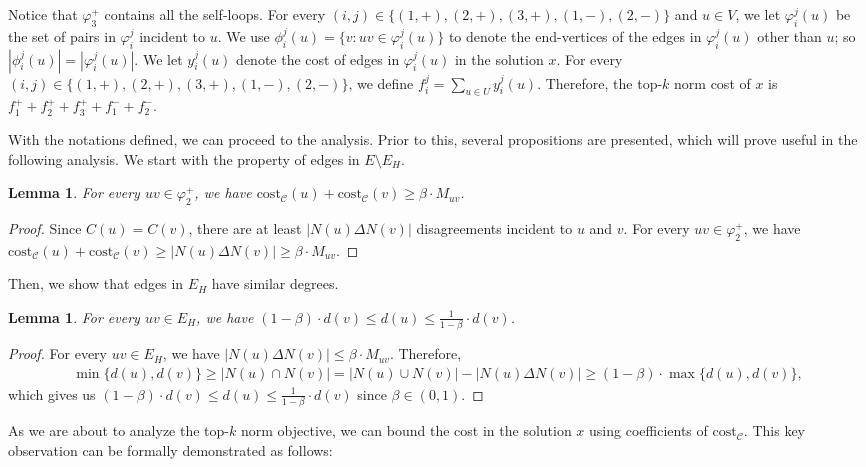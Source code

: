 \documentclass[11pt]{article}
\newcommand{\cost}{\mathrm{cost}}
\newtheorem{lemma}[theorem]{Lemma}
\newcommand{\calC}{{\mathcal{C}}}
\begin{document}
\begin{CJK*}{UTF8}{gbsn}
 Notice that $\varphi^+_3$ contains all the self-loops. For every $(i,j) \in \{(1,+),(2,+),(3,+),(1,-),(2,-)\}$ and $u \in V$, we let $\varphi^j_i(u)$ be the set of pairs in $\varphi^j_i$ incident to $u$. We use $\phi^j_i(u) = \{v: uv \in \varphi^j_i(u)\}$ to denote the end-vertices of the edges in $\varphi^j_i(u)$ other than $u$; so $|\phi^j_i(u)| = |\varphi^j_i(u)|$.  We let $y^j_i(u)$ denote the cost of edges in $\varphi^j_i(u)$ in the solution $x$.  For every $(i,j) \in \{(1,+),(2,+),(3,+),(1,-),(2,-)\}$,  we define $f^j_i = \sum_{u \in U}y^j_i(u)$. Therefore, the top-$k$ norm cost of $x$ is $f^+_1 + f^+_2 + f^+_3 + f^-_1 + f^-_2$. 
\medskip

With the notations defined, we can proceed to the analysis. Prior to this, several propositions are presented, which will prove useful in the following analysis. We start with the property of edges in $E \setminus E_H$.

\begin{lemma}
    \label{lemma:varphi1}
    For every $uv \in \varphi^+_2$, we have $\cost_\calC(u) + \cost_\calC(v) \geq \beta \cdot M_{uv}$.
\end{lemma}
\begin{proof}
    Since $C(u) = C(v)$, there are at least $|N(u) \Delta N(v)|$ disagreements incident to $u$ and $v$. For every $uv \in \varphi^+_2$, we have $\cost_\calC(u) + \cost_\calC(v) \geq |N(u) \Delta N(v)| \geq \beta \cdot M_{uv}.$
\end{proof}

Then, we show that edges in $E_H$ have similar degrees.

\begin{lemma}
    \label{lemma:Hdegreebound}
    For every $uv \in E_H$, we have $(1-\beta)\cdot d(v) \le d(u) \le \frac{1}{1-\beta}\cdot d(v)$.
\end{lemma}
\begin{proof}
    For every $uv \in E_H$, we have $|N(u) \Delta N(v)| \le \beta \cdot M_{uv}$. Therefore,
    \begin{align*}
        \min\{d(u),d(v)\} \ge |N(u) \cap N(v)| = |N(u) \cup N(v)| - |N(u) \Delta N(v)| \ge (1-\beta) \cdot \max\{d(u),d(v)\},
    \end{align*}
    which gives us $(1-\beta)\cdot d(v) \le d(u) \le \frac{1}{1-\beta}\cdot d(v)$ since $\beta \in (0,1)$.
\end{proof}

As we are about to analyze the top-$k$ norm objective, we can bound the cost in the solution $x$ using coefficients of $\cost_\calC$. This key observation can be formally demonstrated as follows:


\end{CJK*}
\end{document}
